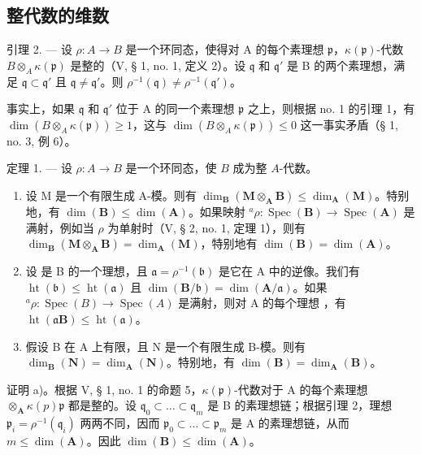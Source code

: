 \subsection{整代数的维数}

引理 2. --- 设 \(\rho: A \to B\) 是一个环同态，使得对 A 的每个素理想 \(\mathfrak{p}\)，\(\kappa(\mathfrak{p})\)-代数 \(B \otimes_{A} \kappa(\mathfrak{p})\) 是整的（V, § 1, no. 1, 定义 2）。设 \(\mathfrak{q}\) 和 \(\mathfrak{q}'\) 是 B 的两个素理想，满足 \(\mathfrak{q} \subset \mathfrak{q}'\) 且 \(\mathfrak{q} \neq \mathfrak{q}'\)。则 \(\rho^{-1}(\mathfrak{q}) \neq \rho^{-1}(\mathfrak{q}')\)。

事实上，如果 \(\mathfrak{q}\) 和 \(\mathfrak{q}'\) 位于 A 的同一个素理想 \(\mathfrak{p}\) 之上，则根据 no. 1 的引理 1，有 \(\dim(B \otimes_{A} \kappa(\mathfrak{p})) \geqslant 1\)，这与 \(\dim(B \otimes_{A} \kappa(\mathfrak{p})) \leqslant 0\) 这一事实矛盾（§ 1, no. 3, 例 6）。

定理 1. --- 设 \(\rho: A \to B\) 是一个环同态，使 \(B\) 成为整 \(A\)-代数。

\begin{enumerate}
\def\labelenumi{\alph{enumi})}
\item
  设 M 是一个有限生成 A-模。则有 \(\dim_{\mathbf{B}}(\mathbf{M} \otimes_{\mathbf{A}} \mathbf{B}) \leqslant \dim_{\mathbf{A}}(\mathbf{M})\)。特别地，有 \(\dim(\mathbf{B}) \leqslant \dim(\mathbf{A})\)。如果映射 \({}^{a}\rho: \operatorname{Spec}(\mathbf{B}) \to \operatorname{Spec}(\mathbf{A})\) 是满射，例如当 \(\rho\) 为单射时（V, § 2, no. 1, 定理 1），则有 \(\dim_{\mathbf{B}}(\mathbf{M} \otimes_{\mathbf{A}} \mathbf{B}) = \dim_{\mathbf{A}}(\mathbf{M})\)，特别地有 \(\dim(\mathbf{B}) = \dim(\mathbf{A})\)。
\item
  设  是 B 的一个理想，且 \(\mathfrak{a} = \rho^{-1}(\mathfrak{b})\) 是它在 A 中的逆像。我们有 \(\operatorname{ht}(\mathfrak{b}) \leqslant \operatorname{ht}(\mathfrak{a})\) 且 \(\dim(\mathbf{B}/\mathfrak{b}) = \dim(\mathbf{A}/\mathfrak{a})\)。如果 \({}^{a}\rho : \operatorname{Spec}(B) \to \operatorname{Spec}(A)\) 是满射，则对 A 的每个理想  ，有 \(\operatorname{ht}(\mathfrak{a}\mathbf{B}) \leqslant \operatorname{ht}(\mathfrak{a})\)。
\item
  假设 B 在 A 上有限，且 N 是一个有限生成 B-模。则有 \(\dim_{\mathbf{B}}(\mathbf{N}) = \dim_{\mathbf{A}}(\mathbf{N})\)。特别地，有 \(\dim(\mathbf{B}) = \dim_{\mathbf{A}}(\mathbf{B})\)。
\end{enumerate}

证明 a)。根据 V, § 1, no. 1 的命题 5，\(\kappa(\mathfrak{p})\)-代数对于 A 的每个素理想 \(\otimes_{\mathbf{A}} \kappa(p)\)\(\mathfrak{p}\) 都是整的。设 \(\mathfrak{q}_0 \subset \ldots \subset \mathfrak{q}_m\) 是 B 的素理想链；根据引理 2，理想 \(\mathfrak{p}_i = \rho^{-1}(\mathfrak{q}_i)\) 两两不同，因而 \(\mathfrak{p}_0 \subset \ldots \subset \mathfrak{p}_m\) 是 A 的素理想链，从而 \(m \leqslant \dim(\mathbf{A})\)。因此 \(\dim(\mathbf{B}) \leqslant \dim(\mathbf{A})\)。


